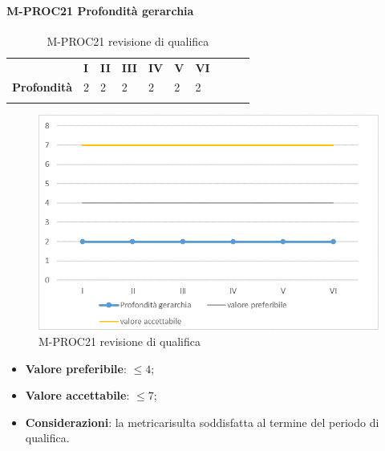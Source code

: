 \paragraph{M-PROC21 Profondità gerarchia} \mbox{}
\begin{longtable}[H!] {						
		>{}p{50mm}  		
		>{}p{8mm}
		>{}p{8mm}		
		>{}p{8mm}		
		>{}p{8mm}		
		>{}p{8mm}		
		>{}p{8mm}
		>{}p{8mm}
		>{}p{8mm}
		>{}p{8mm}
	}
	\rowcolor{gray!50}
	\textbf{} & \textbf{I} & \textbf{II} & \textbf{III} & \textbf{IV} & \textbf{V} & \textbf{VI} \TBstrut \\ [2mm]
	\textbf{Profondità} & 2 & 2 & 2 & 2 & 2 & 2 \TBstrut \\ [2mm]
	\rowcolor{white}
	\caption{M-PROC21 revisione di qualifica}
\end{longtable}
\begin{figure}[H] 	
	\includegraphics[width=\linewidth]{./img/grafici/RQ21.png}	
	\caption{M-PROC21 revisione di qualifica}	
\end{figure}
\begin{itemize}
	\item \textbf{Valore preferibile}: $\le 4$;
	\item \textbf{Valore accettabile}: $\le 7$;
	\item \textbf{Considerazioni}: la metrica\glosp risulta soddisfatta al termine del periodo di qualifica.
\end{itemize}


